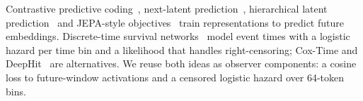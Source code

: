 Contrastive predictive coding~\citep{oord2018cpc}, next-latent prediction~\citep{nextlat2025}, hierarchical latent prediction~\citep{shi2026hilp} and JEPA-style objectives~\citep{assran2023ijepa} train representations to predict future embeddings.
Discrete-time survival networks~\citep{gensheimer2019nnet} model event times with a logistic hazard per time bin and a likelihood that handles right-censoring; Cox-Time and DeepHit~\citep{kvamme2019coxtime,lee2018deephit} are alternatives.
We reuse both ideas as observer components: a cosine loss to future-window activations and a censored logistic hazard over 64-token bins.
